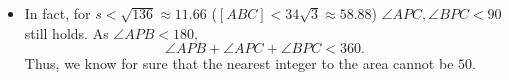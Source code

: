 \begin{enumerate}
            \begin{itemize}
        \item In fact, for $s<\sqrt{136}\approx 11.66$ ($[ABC]<34\sqrt{3}\approx58.88$) $\angle APC, \angle BPC<90$ still holds. As $\angle APB <180,$ 
 \[\angle APB+\angle APC+\angle BPC<360.\] Thus, we know for sure that the nearest integer to the area cannot be $50.$
            \end{itemize}
            


\end{enumerate}